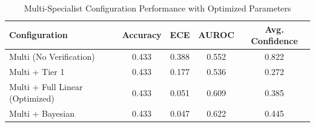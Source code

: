 \begin{table}[h]
\centering
\caption{Multi-Specialist Configuration Performance with Optimized Parameters}
\label{tab:optimized_multi_specialist}
\begin{tabular}{lcccc}
\hline
Configuration & Accuracy & ECE & AUROC & Avg. Confidence \\
\hline
Multi (No Verification) & 0.433 & 0.388 & 0.552 & 0.822 \\
Multi + Tier 1 & 0.433 & 0.177 & 0.536 & 0.272 \\
Multi + Full Linear (Optimized) & 0.433 & 0.051 & 0.609 & 0.385 \\
Multi + Bayesian & 0.433 & 0.047 & 0.622 & 0.445 \\
\hline
\end{tabular}
\end{table}